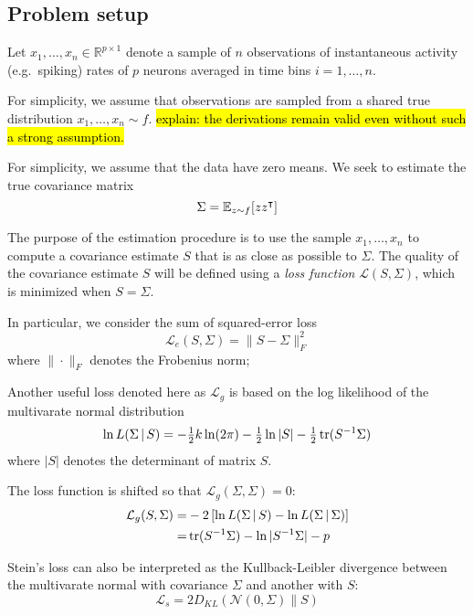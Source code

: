 \subsection{Problem setup}
Let $x_1,\ldots,x_n \in \mathbb R^{p\times 1}$ denote a sample of $n$ observations of instantaneous activity (e.g.~spiking) rates of $p$ neurons averaged in time bins $i=1,\ldots,n$.  

For simplicity, we assume that observations are sampled from a shared true distribution $x_1,\ldots,x_n \sim f$. 
\hl{\tiny explain: the derivations remain valid even without such a strong assumption.} 

For simplicity, we assume that the data have zero means.
We seek to estimate the true covariance matrix 
\begin{equation}
\Sigma=\mathbb E_{z\sim f}[ zz^\intercal]
\end{equation}

The purpose of the estimation procedure is to use the sample $x_1,\ldots,x_n$ to compute a covariance estimate $S$ that is as close as possible to $\Sigma$. 
The quality of the covariance estimate $S$ will be defined using a \emph{loss function} $\mathcal L\left(S, \Sigma\right)$, which is minimized when $S=\Sigma$. 

In particular, we consider the sum of squared-error loss
\begin{equation}
\mathcal L_e( S, \Sigma) =  \| S - \Sigma\|^2_F 
\end{equation}
where $\| \cdot \|_F$ denotes the Frobenius norm;

Another useful loss denoted here as $\mathcal L_g$ is based  on the log likelihood of the multivarate normal distribution 
$$\ln L(\Sigma \,\vert\, S) = - \tfrac 1 2 k\ln(2\pi) - \tfrac 1 2 \ln |S| - \tfrac 1 2 \operatorname{tr}(S^{-1}\Sigma)$$ 
where $|S|$ denotes the determinant of matrix $S$.

The loss function is shifted so that $\mathcal L_g(\Sigma,\Sigma) = 0$:
\begin{equation}
\begin{split}
\mathcal L_g(S,\Sigma) =&  -2 \left[\ln L(\Sigma\,\vert\, S) - \ln L(\Sigma\,\vert\, \Sigma)\right]
\\=& \operatorname{tr}(S^{-1}\Sigma) -\ln |S^{-1}\Sigma| - p
\end{split}
\end{equation}

Stein's loss can also be interpreted as the Kullback-Leibler divergence between the multivarate normal with covariance $\Sigma$ and another with $S$:
\begin{equation}
\mathcal L_{s} = 2 D_{KL} (\mathcal N(0,\Sigma) \| S)
\end{equation}


